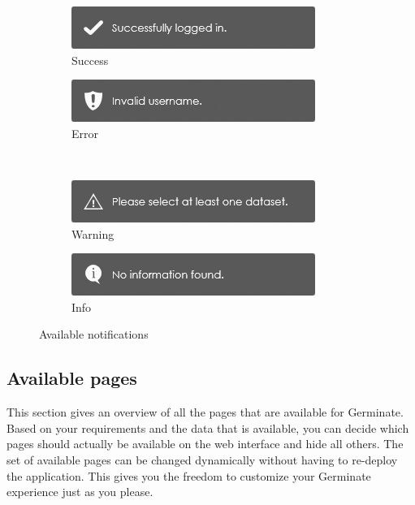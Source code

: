 \begin{figure}
    \centering
    \begin{subfigure}[t]{0.3\textwidth}
        \includegraphics[width=\textwidth]{img/features/notification_success.png}
        \caption{Success}
    \end{subfigure}
    \hspace*{0.1\textwidth}
    \begin{subfigure}[t]{0.3\textwidth}
        \includegraphics[width=\textwidth]{img/features/notification_error.png}
        \caption{Error}
    \end{subfigure}\\
    \begin{subfigure}[t]{0.3\textwidth}
        \includegraphics[width=\textwidth]{img/features/notification_warning.png}
        \caption{Warning}
    \end{subfigure}
    \hspace*{0.1\textwidth}
    \begin{subfigure}[t]{0.3\textwidth}
        \includegraphics[width=\textwidth]{img/features/notification_info.png}
        \caption{Info}
    \end{subfigure}
    \caption{Available notifications}
    \label{fig:notification-types}
\end{figure}

\subsection{Available pages}
\label{sec:pages}
This section gives an overview of all the pages that are available for Germinate. Based on your requirements and the data that is available, you can decide which pages should actually be available on the web interface and hide all others. The set of available pages can be changed dynamically without having to re-deploy the application. This gives you the freedom to customize your Germinate experience just as you please.

